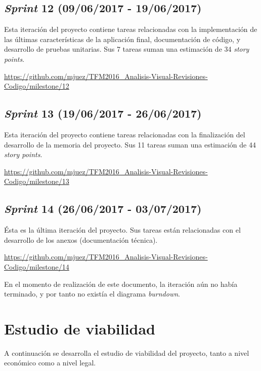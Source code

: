 \subsection{\emph{Sprint} 12 (09/06/2017 - 19/06/2017)}

Esta iteración del proyecto contiene tareas relacionadas con la implementación de las últimas características de la aplicación final, documentación de código, y desarrollo de pruebas unitarias. Sus 7 tareas suman una estimación de 34 \emph{story points}.

\url{https://github.com/mjuez/TFM2016_Analisis-Visual-Revisiones-Codigo/milestone/12}


\subsection{\emph{Sprint} 13 (19/06/2017 - 26/06/2017)}

Esta iteración del proyecto contiene tareas relacionadas con la finalización del desarrollo de la memoria del proyecto. Sus 11 tareas suman una estimación de 44 \emph{story points}.

\url{https://github.com/mjuez/TFM2016_Analisis-Visual-Revisiones-Codigo/milestone/13}


\subsection{\emph{Sprint} 14 (26/06/2017 - 03/07/2017)}

Ésta es la última iteración del proyecto. Sus tareas están relacionadas con el desarrollo de los anexos (documentación técnica).

\url{https://github.com/mjuez/TFM2016_Analisis-Visual-Revisiones-Codigo/milestone/14}

En el momento de realización de este documento, la iteración aún no había terminado, y por tanto no existía el diagrama \emph{burndown}.


\section{Estudio de viabilidad}

A continuación se desarrolla el estudio de viabilidad del proyecto, tanto a nivel económico como a nivel legal.

